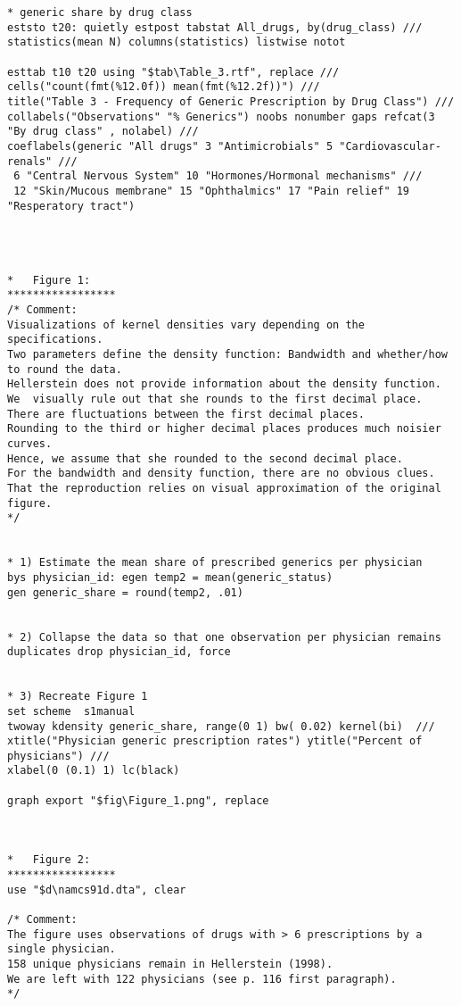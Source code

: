 \documentclass[
]{book}
\begin{document}
\begin{verbatim}
* generic share by drug class
eststo t20: quietly estpost tabstat All_drugs, by(drug_class) ///
statistics(mean N) columns(statistics) listwise notot

esttab t10 t20 using "$tab\Table_3.rtf", replace ///
cells("count(fmt(%12.0f)) mean(fmt(%12.2f))") ///
title("Table 3 - Frequency of Generic Prescription by Drug Class") ///
collabels("Observations" "% Generics") noobs nonumber gaps refcat(3 "By drug class" , nolabel) ///
coeflabels(generic "All drugs" 3 "Antimicrobials" 5 "Cardiovascular-renals" ///
 6 "Central Nervous System" 10 "Hormones/Hormonal mechanisms" ///
 12 "Skin/Mucous membrane" 15 "Ophthalmics" 17 "Pain relief" 19 "Resperatory tract") 




*   Figure 1:
*****************
/* Comment:
Visualizations of kernel densities vary depending on the specifications. 
Two parameters define the density function: Bandwidth and whether/how to round the data.
Hellerstein does not provide information about the density function.
We  visually rule out that she rounds to the first decimal place.
There are fluctuations between the first decimal places.
Rounding to the third or higher decimal places produces much noisier curves.
Hence, we assume that she rounded to the second decimal place.
For the bandwidth and density function, there are no obvious clues.
That the reproduction relies on visual approximation of the original figure.
*/


* 1) Estimate the mean share of prescribed generics per physician
bys physician_id: egen temp2 = mean(generic_status)
gen generic_share = round(temp2, .01) 


* 2) Collapse the data so that one observation per physician remains
duplicates drop physician_id, force


* 3) Recreate Figure 1
set scheme  s1manual
twoway kdensity generic_share, range(0 1) bw( 0.02) kernel(bi)  ///
xtitle("Physician generic prescription rates") ytitle("Percent of physicians") ///
xlabel(0 (0.1) 1) lc(black)

graph export "$fig\Figure_1.png", replace



*   Figure 2:
*****************
use "$d\namcs91d.dta", clear

/* Comment:
The figure uses observations of drugs with > 6 prescriptions by a single physician. 
158 unique physicians remain in Hellerstein (1998).
We are left with 122 physicians (see p. 116 first paragraph).
*/



\end{verbatim}
\end{document}
